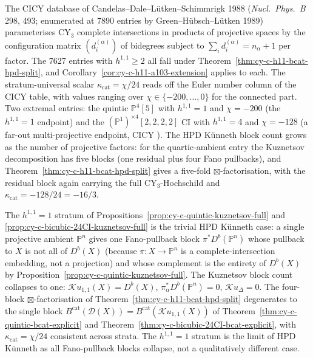 \begin{remark}
\label{rem:cy-c-h11-cicy-census}
The CICY database of Candelas--Dale--Lütken--Schimmrigk 1988
(\emph{Nucl.\ Phys.\ B} 298, 493; enumerated at 7890 entries by
Green--Hübsch--Lütken 1989) parameterises CY$_3$ complete
intersections in products of projective spaces by the configuration
matrix $(d_i^{(\alpha)})$ of bidegrees subject to
$\sum_i d_i^{(\alpha)} = n_\alpha + 1$ per factor. The 7627 entries
with $h^{1,1} \geq 2$ all fall under
Theorem~\ref{thm:cy-c-h11-bcat-hpd-split}, and
Corollary~\ref{cor:cy-c-h11-a103-extension} applies to each. The
stratum-universal scalar $\kappa_{\mathrm{cat}} = \chi/24$ reads off
the Euler number column of the CICY table, with values ranging over
$\chi \in \{-200, \ldots, 0\}$ for the connected part. Two extremal
entries: the quintic $\mathbb P^4[5]$ with $h^{1,1} = 1$ and
$\chi = -200$ (the $h^{1,1} = 1$ endpoint) and the
$(\mathbb P^1)^{\times 4}[2,2,2,2]$ CI with $h^{1,1} = 4$ and
$\chi = -128$ (a far-out multi-projective endpoint, CICY
). The HPD Künneth block count grows as the number
of projective factors: for the quartic-ambient entry the Kuznetsov
decomposition has five blocks (one residual plus four Fano pullbacks),
and Theorem~\ref{thm:cy-c-h11-bcat-hpd-split} gives a five-fold
$\boxtimes$-factorisation, with the residual block again carrying
the full CY$_3$-Hochschild and $\kappa_{\mathrm{cat}} = -128/24 = -16/3$.
\end{remark}

\begin{remark}[Comparison with the \texorpdfstring{$h^{1,1} = 1$}{h-1,1 = 1} strict stratum]
\label{rem:cy-c-h11-comparison-strict}
The $h^{1,1} = 1$ stratum of Propositions~\ref{prop:cy-c-quintic-kuznetsov-full}
and \ref{prop:cy-c-bicubic-24CI-kuznetsov-full} is the trivial
HPD Künneth case: a single projective ambient $\mathbb P^n$ gives one
Fano-pullback block $\pi^* D^b(\mathbb P^n)$ whose pullback to $X$ is
not all of $D^b(X)$ (because $\pi : X \to \mathbb P^n$ is a
complete-intersection embedding, not a projection) and whose
complement is the entirety of $D^b(X)$ by
Proposition~\ref{prop:cy-c-quintic-kuznetsov-full}. The Kuznetsov
block count collapses to one: $\mathcal{K}u_{1,1}(X) = D^b(X)$,
$\pi_\alpha^* D^b(\mathbb P^n) = 0$, $\mathcal{K}u_\Delta = 0$. The
four-block $\boxtimes$-factorisation of
Theorem~\ref{thm:cy-c-h11-bcat-hpd-split} degenerates to the single
block
$B^{\mathrm{cat}}(\mathcal D(X)) = B^{\mathrm{cat}}(\mathcal{K}u_{1,1}(X))$
of Theorem~\ref{thm:cy-c-quintic-bcat-explicit} and
Theorem~\ref{thm:cy-c-bicubic-24CI-bcat-explicit}, with
$\kappa_{\mathrm{cat}} = \chi/24$ consistent across strata.
The $h^{1,1} = 1$ stratum is the limit of HPD Künneth as all
Fano-pullback blocks collapse, not a qualitatively different case.
\end{remark}
